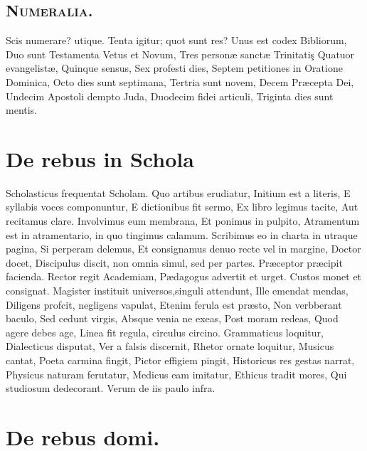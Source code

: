 \documentclass[12pt, twocolumn]{memoir}
\begin{document}
\section*{\textsc{Numeralia.}}

Scis numerare? utique.
Tenta igitur; quot sunt res?
Unus est codex Bibliorum,
Duo sunt Testamenta Vetus et Novum,
Tres personæ sanctæ Trinitatiş
Quatuor evangelistæ,
Quinque sensus,
Sex profesti dies,
Septem petitiones in Oratione Dominica,
Octo dies sunt septimana,
Tertria sunt novem,
Decem Præcepta Dei,
Undecim Apostoli dempto Juda,
Duodecim fidei articuli,
Triginta dies sunt mentis.

\chapter{De rebus in Schola}

Scholasticus frequentat Scholam.
Quo artibus erudiatur,
Initium est a literis,
E syllabis voces componuntur,
E dictionibus fit sermo,
Ex libro legimus tacite,
Aut recitamus clare.
Involvimus eum membrana,
Et ponimus in pulpito,
Atramentum est in atramentario, in quo tingimus calamum.
Scribimus eo in charta in utraque pagina,
Si perperam delemus,
Et consignamus denuo recte vel in margine,
Doctor docet,
Discipulus discit, non omnia simul, sed per partes.
Præceptor præcipit facienda.
Rector regit Academiam,
Pædagogus advertit et urget.
Custos monet et consignat.
Magister instituit universos,singuli attendunt,
Ille emendat mendas,
Diligens profcit, negligens vapulat,
Etenim ferula est præsto,
Non verbberant baculo,
Sed cedunt virgis,
Absque venia ne exeas,
Post moram redeas,
Quod agere debes age,
Linea fit regula, circulus circino.
Grammaticus loquitur,
Dialecticus disputat,
Ver a falsis discernit,
Rhetor ornate loquitur,
Musicus cantat,
Poeta carmina fingit,
Pictor effigiem pingit,
Historicus res gestas narrat,
Physicus naturam ferutatur,
Medicus eam imitatur,
Ethicus tradit mores,
Qui studiosum dedecorant.
Verum de iis paulo infra.


\chapter{De rebus domi.}
\end{document}
